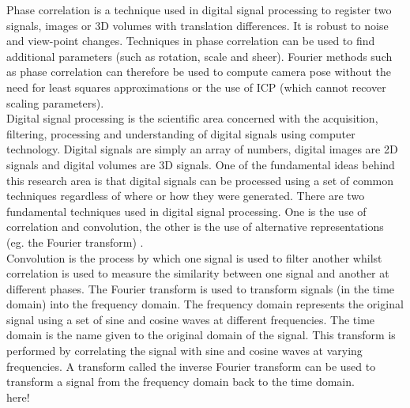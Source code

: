 
Phase correlation is a technique used in digital signal processing to register two signals, images or 3D volumes with translation differences. It is robust to noise and view-point changes. Techniques in phase correlation can be used to find additional parameters (such as rotation, scale and sheer). Fourier methods such as phase correlation can therefore be used to compute camera pose without the need for least squares approximations or the use of ICP (which cannot recover scaling parameters). \\ 

Digital signal processing is the scientific area concerned with the acquisition, filtering, processing and understanding of digital signals using computer technology. Digital signals are simply an array of numbers, digital images are 2D signals and digital volumes are 3D signals. One of the fundamental ideas behind this research area is that digital signals can be processed using a set of common techniques regardless of where or how they were generated. There are two fundamental techniques used in digital signal processing. One is the use of correlation and convolution, the other is the use of alternative representations (eg. the Fourier transform) \cite{Smith97Scientist}. \\

Convolution is the process by which one signal is used to filter another whilst correlation is used to measure the similarity between one signal and another at different phases. The Fourier transform is used to transform signals (in the time domain) into the frequency domain. The frequency domain represents the original signal using a set of sine and cosine waves at different frequencies. The time domain is the name given to the original domain of the signal. This transform is performed by correlating the signal with sine and cosine waves at varying frequencies. A transform called the inverse Fourier transform can be used to transform a signal from the frequency domain back to the time domain. \\

here!

